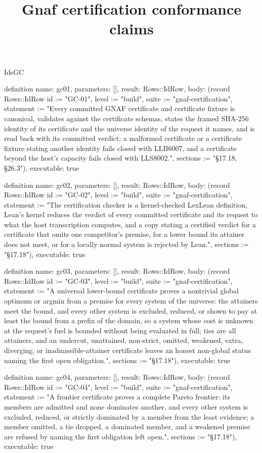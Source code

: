 \begin{lexlean}{IdsGC}
\title{Gnaf certification conformance claims}
\begin{semanticmodule}
definition{
  name: gc01,
  parameters: [],
  result: Rows::IdRow,
  body: (record Rows::IdRow {id := "GC-01", level := "build", suite := "gnaf-certification", statement := "Every committed GNAF certificate and certificate fixture is canonical, validates against the certificate schemas, states the framed SHA-256 identity of its certificate and the universe identity of the request it names, and is read back with its committed verdict; a malformed certificate or a certificate fixture stating another identity fails closed with LLB6007, and a certificate beyond the host's capacity fails closed with LLS8002.", sections := "§17.18, §26.3"}),
  executable: true
}

definition{
  name: gc02,
  parameters: [],
  result: Rows::IdRow,
  body: (record Rows::IdRow {id := "GC-02", level := "build", suite := "gnaf-certification", statement := "The certification checker is a kernel-checked LexLean definition, Lean's kernel reduces the verdict of every committed certificate and its request to what the host transcription computes, and a copy stating a certified verdict for a certificate that omits one competitor's premise, for a lower bound its attainer does not meet, or for a locally normal system is rejected by Lean.", sections := "§17.18"}),
  executable: true
}

definition{
  name: gc03,
  parameters: [],
  result: Rows::IdRow,
  body: (record Rows::IdRow {id := "GC-03", level := "build", suite := "gnaf-certification", statement := "A universal lower-bound certificate proves a nontrivial global optimum or argmin from a premise for every system of the universe: the attainers meet the bound, and every other system is excluded, reduced, or shown to pay at least the bound from a prefix of the domain, so a system whose cost is unknown at the request's fuel is bounded without being evaluated in full; ties are all attainers, and an undercut, unattained, non-strict, omitted, weakened, extra, diverging, or inadmissible-attainer certificate leaves an honest non-global status naming the first open obligation.", sections := "§17.18"}),
  executable: true
}

definition{
  name: gc04,
  parameters: [],
  result: Rows::IdRow,
  body: (record Rows::IdRow {id := "GC-04", level := "build", suite := "gnaf-certification", statement := "A frontier certificate proves a complete Pareto frontier: its members are admitted and none dominates another, and every other system is excluded, reduced, or strictly dominated by a member from the least evidence; a member omitted, a tie dropped, a dominated member, and a weakened premise are refused by naming the first obligation left open.", sections := "§17.18"}),
  executable: true
}


\end{semanticmodule}
\end{lexlean}
